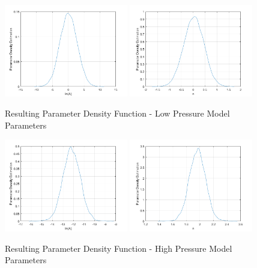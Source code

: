 \documentclass{article}
\begin{document}
\begin{figure}[htb]
\centering
\includegraphics[width=0.48\textwidth]{PDF_lnA_LP.png}
\includegraphics[width=0.48\textwidth]{PDF_n_LP.png}
\caption{Resulting Parameter Density Function - Low Pressure Model Parameters}
\label{LPpdf}
\end{figure}

\begin{figure}[htb]
\centering
\includegraphics[width=0.48\textwidth]{PDF_lnA_HP.png}
\includegraphics[width=0.48\textwidth]{PDF_n_HP.png}
\caption{Resulting Parameter Density Function - High Pressure Model Parameters}
\label{HPpdf}
\end{figure}
\end{document}
